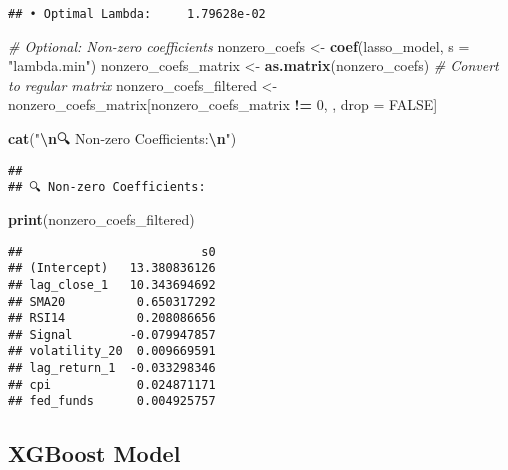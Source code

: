 \documentclass[
]{article}
\newenvironment{Shaded}{\begin{snugshade}}{\end{snugshade}}
\newcommand{\AttributeTok}[1]{\textcolor[rgb]{0.13,0.29,0.53}{#1}}
\newcommand{\CommentTok}[1]{\textcolor[rgb]{0.56,0.35,0.01}{\textit{#1}}}
\newcommand{\ConstantTok}[1]{\textcolor[rgb]{0.56,0.35,0.01}{#1}}
\newcommand{\DecValTok}[1]{\textcolor[rgb]{0.00,0.00,0.81}{#1}}
\newcommand{\FunctionTok}[1]{\textcolor[rgb]{0.13,0.29,0.53}{\textbf{#1}}}
\newcommand{\NormalTok}[1]{#1}
\newcommand{\OtherTok}[1]{\textcolor[rgb]{0.56,0.35,0.01}{#1}}
\newcommand{\SpecialCharTok}[1]{\textcolor[rgb]{0.81,0.36,0.00}{\textbf{#1}}}
\newcommand{\StringTok}[1]{\textcolor[rgb]{0.31,0.60,0.02}{#1}}
\begin{document}
\begin{verbatim}
## • Optimal Lambda:     1.79628e-02
\end{verbatim}

\begin{Shaded}
\begin{Highlighting}[]
\CommentTok{\# Optional: Non{-}zero coefficients}
\NormalTok{nonzero\_coefs }\OtherTok{\textless{}{-}} \FunctionTok{coef}\NormalTok{(lasso\_model, }\AttributeTok{s =} \StringTok{"lambda.min"}\NormalTok{)}
\NormalTok{nonzero\_coefs\_matrix }\OtherTok{\textless{}{-}} \FunctionTok{as.matrix}\NormalTok{(nonzero\_coefs)  }\CommentTok{\# Convert to regular matrix}
\NormalTok{nonzero\_coefs\_filtered }\OtherTok{\textless{}{-}}\NormalTok{ nonzero\_coefs\_matrix[nonzero\_coefs\_matrix }\SpecialCharTok{!=} \DecValTok{0}\NormalTok{, , drop }\OtherTok{=} \ConstantTok{FALSE}\NormalTok{]}

\FunctionTok{cat}\NormalTok{(}\StringTok{"}\SpecialCharTok{\textbackslash{}n}\StringTok{🔍 Non{-}zero Coefficients:}\SpecialCharTok{\textbackslash{}n}\StringTok{"}\NormalTok{)}
\end{Highlighting}
\end{Shaded}

\begin{verbatim}
## 
## 🔍 Non-zero Coefficients:
\end{verbatim}

\begin{Shaded}
\begin{Highlighting}[]
\FunctionTok{print}\NormalTok{(nonzero\_coefs\_filtered)}
\end{Highlighting}
\end{Shaded}

\begin{verbatim}
##                         s0
## (Intercept)   13.380836126
## lag_close_1   10.343694692
## SMA20          0.650317292
## RSI14          0.208086656
## Signal        -0.079947857
## volatility_20  0.009669591
## lag_return_1  -0.033298346
## cpi            0.024871171
## fed_funds      0.004925757
\end{verbatim}

\subsection{XGBoost Model}\label{xgboost-model}
\end{document}
